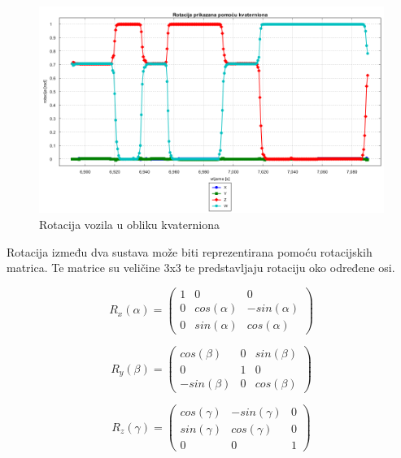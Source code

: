 \begin{figure}[h!]
  \includegraphics[scale=0.4]{images/rotacija_kvaterni.png}
  \caption{Rotacija vozila u obliku kvaterniona}
  \label{fig:gt_rot_kv}
\end{figure}

Rotacija između dva sustava može biti reprezentirana pomoću rotacijskih matrica. Te matrice su veličine 3x3 te predstavljaju rotaciju oko određene osi.

\begin{equation}
  R_{x}(\alpha) =
  \begin{pmatrix}
    1 & 0 & 0\\
    0 & cos(\alpha) & -sin(\alpha)\\
    0 & sin(\alpha) & cos(\alpha)
  \end{pmatrix}
  \label{mat:rot_mat_x}
\end{equation}

\begin{equation}
  R_{y}(\beta) =
  \begin{pmatrix}
    cos(\beta) & 0 & sin(\beta)\\
    0 & 1 & 0\\
    -sin(\beta) & 0 & cos(\beta)
  \end{pmatrix}
  \label{mat:rot_mat_y}
\end{equation}

\begin{equation}
  R_{z}(\gamma) =
  \begin{pmatrix}
    cos(\gamma) & -sin(\gamma) & 0\\
    sin(\gamma) & cos(\gamma) & 0\\
    0 & 0 & 1
  \end{pmatrix}
  \label{mat:rot_mat_z}
\end{equation}

